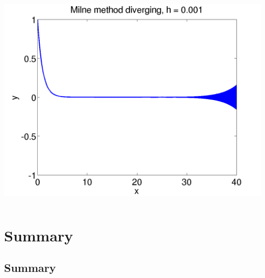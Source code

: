 \documentclass{beamer}
\begin{document}
\begin{frame}
\begin{columns}
\begin{column}{0.5\textwidth}
\begin{overlayarea}{\textwidth}{0.6\textheight}
{\begin{center}
            \includegraphics[height=0.5\textheight]{figures/MilneStability2}
          \end{center}
        }
      \end{overlayarea}
    \end{column}
 \end{columns}

\end{frame}

\section{Summary}

\subsection{Summary}
\end{document}

